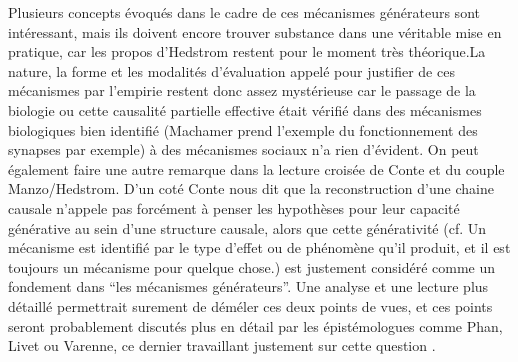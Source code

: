 


Plusieurs concepts évoqués dans le cadre de ces mécanismes générateurs sont intéressant, mais ils doivent encore trouver substance dans une véritable mise en pratique, car les propos d'Hedstrom restent pour le moment très théorique.La nature, la forme et les modalités d'évaluation appelé pour justifier de ces mécanismes par l'empirie restent donc assez mystérieuse car le passage de la biologie ou cette causalité partielle effective était vérifié dans des mécanismes biologiques bien identifié (Machamer prend l'exemple du fonctionnement des synapses par exemple) à des mécanismes sociaux n'a rien d'évident. On peut également faire une autre remarque dans la lecture croisée de Conte et du couple Manzo/Hedstrom. D'un coté Conte nous dit que la reconstruction d'une chaine causale n'appele pas forcément à penser les hypothèses pour leur capacité générative au sein d'une structure causale, alors que cette générativité (cf. Un mécanisme est identifié par le type d'effet ou de phénomène qu'il produit, et il est toujours un mécanisme pour quelque chose.) est justement considéré comme un fondement dans \enquote{les mécanismes générateurs}. Une analyse et une lecture plus détaillé permettrait surement de déméler ces deux points de vues, et ces points seront probablement discutés plus en détail par les épistémologues comme Phan, Livet ou Varenne, ce dernier travaillant justement sur cette question \autocite{Varenne2014}. 






